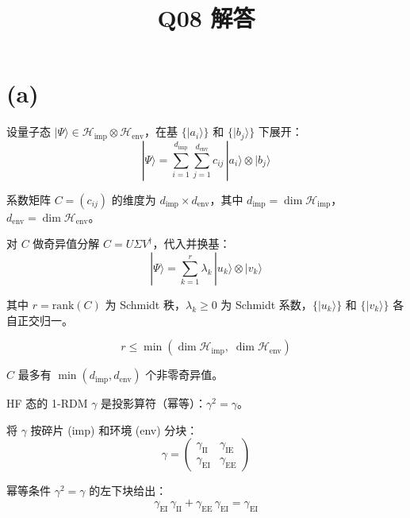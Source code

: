 \documentclass[11pt,a4paper]{article}
\title{Q08 解答}
\author{}
\date{}
\begin{document}
\maketitle


\section{(a)}

设量子态 $|\Psi\rangle \in \mathcal{H}_{\text{imp}} \otimes \mathcal{H}_{\text{env}}$，在基 $\{|a_i\rangle\}$ 和 $\{|b_j\rangle\}$ 下展开：
\begin{equation}
  |\Psi\rangle = \sum_{i=1}^{d_{\text{imp}}} \sum_{j=1}^{d_{\text{env}}} c_{ij}\, |a_i\rangle \otimes |b_j\rangle
\end{equation}

系数矩阵 $C = (c_{ij})$ 的维度为 $d_{\text{imp}} \times d_{\text{env}}$，其中 $d_{\text{imp}} = \dim\mathcal{H}_{\text{imp}}$，$d_{\text{env}} = \dim\mathcal{H}_{\text{env}}$。

对 $C$ 做奇异值分解 $C = U\Sigma V^\dagger$，代入并换基：
\begin{equation}
  |\Psi\rangle = \sum_{k=1}^{r} \lambda_k\, |u_k\rangle \otimes |v_k\rangle
\end{equation}

其中 $r = \text{rank}(C)$ 为 Schmidt 秩，$\lambda_k \geq 0$ 为 Schmidt 系数，$\{|u_k\rangle\}$ 和 $\{|v_k\rangle\}$ 各自正交归一。

\begin{equation}
  \boxed{\;r \leq \min(\dim\mathcal{H}_{\text{imp}},\; \dim\mathcal{H}_{\text{env}})\;}
\end{equation}

$C$ 最多有 $\min(d_{\text{imp}}, d_{\text{env}})$ 个非零奇异值。

HF 态的 1-RDM $\gamma$ 是投影算符（幂等）：$\gamma^2 = \gamma$。

将 $\gamma$ 按碎片 (imp) 和环境 (env) 分块：
\begin{equation}
  \gamma = \begin{pmatrix} \gamma_{\text{II}} & \gamma_{\text{IE}} \\ \gamma_{\text{EI}} & \gamma_{\text{EE}} \end{pmatrix}
\end{equation}

幂等条件 $\gamma^2 = \gamma$ 的左下块给出：
\begin{equation}
  \gamma_{\text{EI}}\,\gamma_{\text{II}} + \gamma_{\text{EE}}\,\gamma_{\text{EI}} = \gamma_{\text{EI}}
\end{equation}
\end{document}
